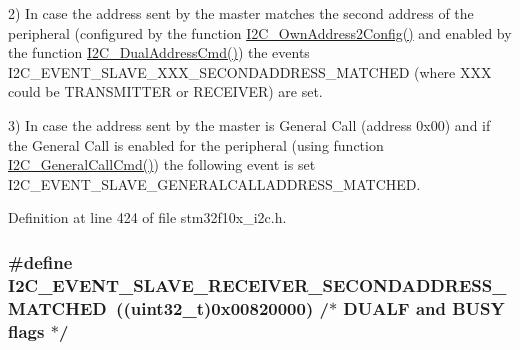 2) In case the address sent by the master matches the second address of the peripheral (configured by the function \hyperlink{group___i2_c___private___functions_ga7be2cc634a613c8e3539137e897a22df}{I2\+C\+\_\+\+Own\+Address2\+Config()} and enabled by the function \hyperlink{group___i2_c___private___functions_ga02145a333a56e79557d6ef4ea03fc313}{I2\+C\+\_\+\+Dual\+Address\+Cmd()}) the events I2\+C\+\_\+\+E\+V\+E\+N\+T\+\_\+\+S\+L\+A\+V\+E\+\_\+\+X\+X\+X\+\_\+\+S\+E\+C\+O\+N\+D\+A\+D\+D\+R\+E\+S\+S\+\_\+\+M\+A\+T\+C\+H\+ED (where X\+XX could be T\+R\+A\+N\+S\+M\+I\+T\+T\+ER or R\+E\+C\+E\+I\+V\+ER) are set.

3) In case the address sent by the master is General Call (address 0x00) and if the General Call is enabled for the peripheral (using function \hyperlink{group___i2_c___private___functions_ga65c740fc8d7b3b9f15cc432d8699d471}{I2\+C\+\_\+\+General\+Call\+Cmd()}) the following event is set I2\+C\+\_\+\+E\+V\+E\+N\+T\+\_\+\+S\+L\+A\+V\+E\+\_\+\+G\+E\+N\+E\+R\+A\+L\+C\+A\+L\+L\+A\+D\+D\+R\+E\+S\+S\+\_\+\+M\+A\+T\+C\+H\+ED. 

Definition at line 424 of file stm32f10x\+\_\+i2c.\+h.

\subsubsection[{\texorpdfstring{I2\+C\+\_\+\+E\+V\+E\+N\+T\+\_\+\+S\+L\+A\+V\+E\+\_\+\+R\+E\+C\+E\+I\+V\+E\+R\+\_\+\+S\+E\+C\+O\+N\+D\+A\+D\+D\+R\+E\+S\+S\+\_\+\+M\+A\+T\+C\+H\+ED}{I2C_EVENT_SLAVE_RECEIVER_SECONDADDRESS_MATCHED}}]{\setlength{\rightskip}{0pt plus 5cm}\#define I2\+C\+\_\+\+E\+V\+E\+N\+T\+\_\+\+S\+L\+A\+V\+E\+\_\+\+R\+E\+C\+E\+I\+V\+E\+R\+\_\+\+S\+E\+C\+O\+N\+D\+A\+D\+D\+R\+E\+S\+S\+\_\+\+M\+A\+T\+C\+H\+ED~(({\bf uint32\+\_\+t})0x00820000)  /$\ast$ D\+U\+A\+L\+F and B\+U\+S\+Y flags $\ast$/}\hypertarget{group___i2_c___events_ga17e78ab01fa980b3df10f8d9f6864c48}{}\label{group___i2_c___events_ga17e78ab01fa980b3df10f8d9f6864c48}


